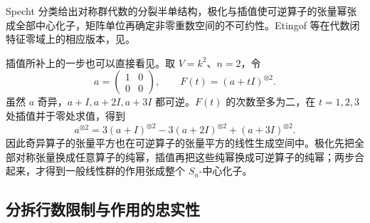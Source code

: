 Specht 分类给出对称群代数的分裂半单结构，极化与插值使可逆算子的张量幂张成全部中心化子，矩阵单位再确定非零重数空间的不可约性。Etingof 等在代数闭特征零域上的相应版本，见\cite[Theorem 5.18.1; Proposition 5.19.1 and Corollary 5.19.2, pp. 120--122]{EtingofEtAl2011RepresentationTheory}。

\ProseParagraphBreak
插值所补上的一步也可以直接看见。取 \(V=k^2\)、\(n=2\)，令
\[
	a=\begin{pmatrix}1&0\\0&0\end{pmatrix},
	\qquad F(t)=(a+tI)^{\otimes2}.
\]
虽然 \(a\) 奇异，\(a+I,a+2I,a+3I\) 都可逆。\(F(t)\) 的次数至多为二，在 \(t=1,2,3\) 处插值并于零处求值，得到
\[
	a^{\otimes2} =3(a+I)^{\otimes2}-3(a+2I)^{\otimes2}+(a+3I)^{\otimes2}.
\]
因此奇异算子的张量平方也在可逆算子的张量平方的线性生成空间中。极化先把全部对称张量换成任意算子的纯幂，插值再把这些纯幂换成可逆算子的纯幂；两步合起来，才得到一般线性群的作用张成整个 \(S_n\)-中心化子。

\subsection{分拆行数限制与作用的忠实性}
\label{b5:subsec:0703:05}

